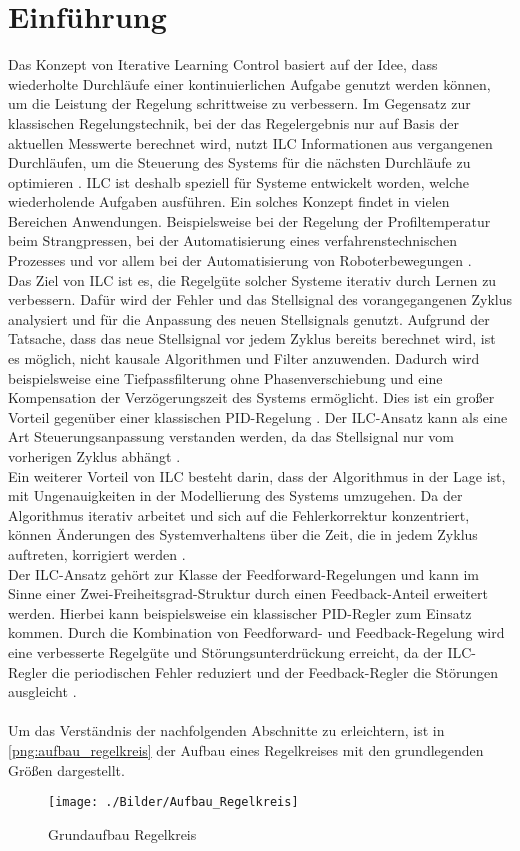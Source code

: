 \section{Einführung}
\label{sec_definition}
Das Konzept von Iterative Learning Control basiert auf der Idee, dass wiederholte Durchläufe einer kontinuierlichen Aufgabe genutzt werden können, um die Leistung der Regelung schrittweise zu verbessern. Im Gegensatz zur klassischen Regelungs\-technik, bei der das Regelergebnis nur auf Basis der aktuellen Messwerte berechnet wird, nutzt ILC Informationen aus vergangenen Durchläufen, um die Steuerung des Systems für die nächsten Durchläufe zu optimieren \cite{UniWien}. ILC ist deshalb speziell für Systeme entwickelt worden, welche wiederholende Aufgaben ausführen. Ein solches Konzept findet in vielen Bereichen Anwendungen. Beispielsweise bei der Regelung der Profiltemperatur beim Strangpressen, bei der Automatisierung eines verfahrenstechnischen Prozesses und vor allem bei der Automatisierung von Roboterbewegungen \cite{ILC_einsatzgebiete}. \\
Das Ziel von ILC ist es, die Regelgüte solcher Systeme iterativ durch Lernen zu verbessern. Dafür wird der Fehler und das Stellsignal des vorangegangenen Zyklus analysiert und für die Anpassung des neuen Stellsignals genutzt. Aufgrund der Tatsache, dass das neue Stellsignal vor jedem Zyklus bereits berechnet wird, ist es möglich, nicht kausale Algorithmen und Filter anzuwenden. Dadurch wird beispielsweise eine Tiefpassfilterung ohne Phasenverschiebung und eine Kompensation der Ver\-zögerungs\-zeit des Systems ermöglicht. Dies ist ein großer Vorteil gegenüber einer klassischen PID-Regelung \cite{ILC_einsatzgebiete}. Der ILC-Ansatz kann als eine Art Steuerungsanpassung verstanden werden, da das Stellsignal nur vom vorherigen Zyklus abhängt \cite{UniWien}.\\
Ein weiterer Vorteil von ILC besteht darin, dass der Algorithmus in der Lage ist, mit Ungenauigkeiten in der Modellierung des Systems umzugehen. Da der Algorithmus iterativ arbeitet und sich auf die Fehlerkorrektur konzentriert, können Änderungen des Systemverhaltens über die Zeit, die in jedem Zyklus auftreten, korrigiert werden \cite{AndresHengenPandit+2002+112}.\\
Der ILC-Ansatz gehört zur Klasse der Feedforward-Regelungen und kann im Sinne einer Zwei-Freiheitsgrad-Struktur durch einen Feedback-Anteil erweitert werden.  Hierbei kann beispielsweise ein klassischer PID-Regler zum Einsatz kommen. Durch die Kombination von Feedforward- und Feedback-Regelung wird eine verbesserte Regelgüte und Störungsunterdrückung erreicht, da der ILC-Regler die periodischen Fehler reduziert und der Feedback-Regler die Störungen ausgleicht \cite{UniWien}.\\
\\
Um das Verständnis der nachfolgenden Abschnitte zu erleichtern, ist in \autoref{png:aufbau_regelkreis} der Aufbau eines Regelkreises mit den grundlegenden Größen dargestellt.
\begin{figure}[ht]
	\centering
	\texttt{[image: ./Bilder/Aufbau\_Regelkreis]}
	\caption{Grundaufbau Regelkreis}
	\label{png:aufbau_regelkreis}
\end{figure}

